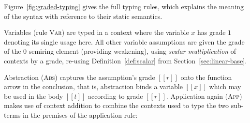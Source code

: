 Figure~\ref{fig:graded-typing} gives the full typing rules, which explains the meaning of
the syntax with reference to their static semantics.

Variables (rule \textsc{Var}) are typed in a context where the variable $x$ has
grade $1$ denoting its single usage here. All other variable assumptions are
given the grade of the $0$ semiring element (providing weakening), using
\textit{scalar multiplication} of contexts by a grade, re-using
Definition~\ref{def:scalar} from Section~\ref{sec:linear-base}.

Abstraction (\textsc{Abs}) captures the assumption's grade $[[ r ]]$ onto the
function arrow in the conclusion, that is, abstraction binds a variable $[[x]]$
which may be used in the body $[[t]]$ according to grade $[[ r ]]$. Application
again (\textsc{App}) makes use of context addition to combine the contexts used to
type the two sub-terms in the premises of the application rule:


